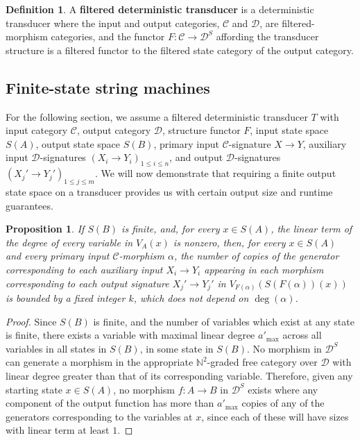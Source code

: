 \documentclass{article}
\newtheorem{proposition}[theorem]{Proposition}
\theoremstyle{definition}
\newtheorem{definition}{Definition}[section]
\theoremstyle{remark}
\begin{document}
\begin{definition}
\label{def:filtereddcc} A \textbf{filtered deterministic transducer}
is a deterministic transducer where the input and output categories,
$\mathcal{C}$ and $\mathcal{D}$, are
filtered-morphism categories, and the functor $F:\mathcal{C}\to\mathcal{D}^S$
affording the transducer
structure is a
filtered functor to the filtered state category of the output category.
\end{definition}
\subsection{Finite-state string machines}
For the following section, we assume
a filtered deterministic transducer $T$ with input category
$\mathcal{C}$, output category $\mathcal{D}$, structure functor
$F$, input state space $S(A)$, output state space $S(B)$, primary
input $\mathcal{C}$-signature $X\to Y$, auxiliary input
$\mathcal{D}$-signatures $(X_i \to Y_i)_{1 \leq i \leq n}$, and
output $\mathcal{D}$-signatures $(X_j' \to Y_j')_{1 \leq j \leq m}$.
We will now demonstrate that requiring a finite output state space on
a transducer provides us with certain output size and runtime guarantees.

\begin{proposition}
\label{prop:boundedduplication}
If $S(B)$ is finite, and, for
every $x \in S(A)$,
the linear term of the degree of every variable in $V_{A}(x)$ is
nonzero, then, for every $x \in S(A)$ and every primary input
$\mathcal{C}$-morphism $\alpha$, the number of copies of
the generator corresponding to each
auxiliary input $X_i \to Y_i$ appearing in each morphism
corresponding to each output signature
$X_j'\to Y_j'$ in
$V_{F(\alpha)}(S(F(\alpha))(x))$ is bounded by a
fixed integer $k$, which does not depend on $\deg (\alpha)$.
\end{proposition}
\begin{proof}
Since $S(B)$ is finite, and the number of variables which exist
at any state is finite,
there exists a variable with maximal linear degree $a'_{\max}$ across
all variables in all states in $S(B)$, in
some state in $S(B)$. No morphism in $\mathcal{D}^S$ can generate
a morphism in the appropriate $\mathbb{N}^2$-graded free category
over $\mathcal{D}$ with linear degree greater than that of its corresponding
variable. Therefore, given any starting state $x \in S(A)$, no morphism
$f:A\to B$
in $\mathcal{D}^S$ exists where any component
of the output function has more than
$a'_{\max}$ copies of any of the generators corresponding to the variables
at
$x$, since each of these will have sizes with linear term at least $1$.
\end{proof}
\end{document}
